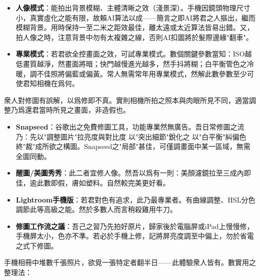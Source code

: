 
\begin{itemize}
  \item \textbf{人像模式}：能拍出背景模糊、主體清晰之效（淺景深）。手機因鏡頭物理尺寸小，真實虛化之能有限，故賴AI算法以成——簡言之即AI將君之人摳出，繼而模糊背景。用時保持一至二米之距效最佳，離太遠或太近算法皆易出錯。又，拍人像之時，注意背景中勿有太複雜之線，否則AI扣圖將於髮際邊緣"翻車"。
  \item \textbf{專業模式}：若君欲全控畫面之效，可試專業模式。數個關鍵參數當知：ISO越低畫質越淨，然畫面將暗；快門越慢進光越多，然手抖將糊；白平衡管色之冷暖，調不佳照將偏藍或偏黃。常人無需常年用專業模式，然解此數參數至少可使君知相機在爲何。
\end{itemize}


衆人對修圖有誤解，以爲修即不真。實則相機所拍之照本與肉眼所見不同，適當調整乃爲還君當時所見之畫面，非造假也。

\begin{itemize}
  \item \textbf{Snapseed}：谷歌出之免費修圖工具，功能專業然無廣告。吾日常修圖之流乃：先以"調整圖片"拉亮度與對比度 以"突出細節"銳化之 以"白平衡"糾偏色 終"裁"成所欲之構圖。Snapseed之"局部"甚佳，可僅調畫面中某一區域，無需全圖同動。
  \item \textbf{醒圖/美圖秀秀}：此二者宜修人像。然吾以爲有一則：美顏濾鏡拉至三成內即佳，逾此數即假，膚如塑料。自然較完美更好看。
  \item \textbf{Lightroom手機版}：若君對色有追求，此乃最專業者。有曲線調整、HSL分色調節此等高級之能。然於多數人而言稍殺雞用牛刀。
  \item \textbf{修圖工作流之議}：吾己之習乃先拍好原片，歸家後於電腦屏或iPad上慢慢修，手機屏太小，色亦不準。若必於手機上修，記將屏亮度調至中偏上，勿於省電之式下修圖。
\end{itemize}


手機相冊中堆數千張照片，欲覓一張特定者翻半日——此體驗衆人皆有。數實用之整理法：

